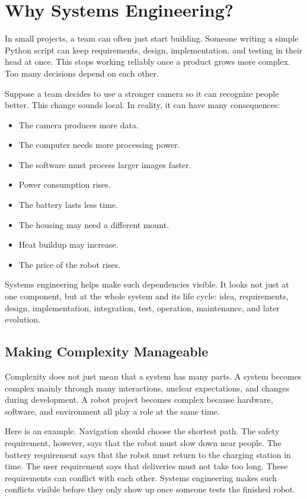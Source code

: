 \section{Why Systems Engineering?}
In small projects, a team can often just start building. Someone writing a simple Python script can keep requirements, design, implementation, and testing in their head at once. This stops working reliably once a product grows more complex. Too many decisions depend on each other.

Suppose a team decides to use a stronger camera so it can recognize people better. This change sounds local. In reality, it can have many consequences:

\begin{itemize}
    \item The camera produces more data.
    \item The computer needs more processing power.
    \item The software must process larger images faster.
    \item Power consumption rises.
    \item The battery lasts less time.
    \item The housing may need a different mount.
    \item Heat buildup may increase.
    \item The price of the robot rises.
\end{itemize}

Systems engineering helps make such dependencies visible. It looks not just at one component, but at the whole system and its life cycle: idea, requirements, design, implementation, integration, test, operation, maintenance, and later evolution.

\subsection{Making Complexity Manageable}
Complexity does not just mean that a system has many parts. A system becomes complex mainly through many interactions, unclear expectations, and changes during development. A robot project becomes complex because hardware, software, and environment all play a role at the same time.

Here is an example. Navigation should choose the shortest path. The safety requirement, however, says that the robot must slow down near people. The battery requirement says that the robot must return to the charging station in time. The user requirement says that deliveries must not take too long. These requirements can conflict with each other. Systems engineering makes such conflicts visible before they only show up once someone tests the finished robot.

